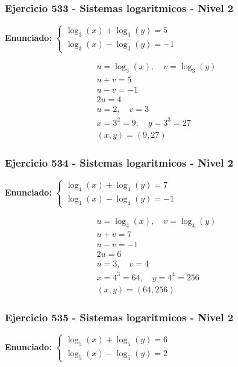 \documentclass[12pt,a4paper]{article}
\begin{document}
\subsubsection*{Ejercicio 533 - Sistemas logaritmicos - Nivel 2}
\textbf{Enunciado:} \(\begin{cases} \log_{3}\left(x\right)+\log_{3}\left(y\right)=5\\ \log_{3}\left(x\right)-\log_{3}\left(y\right)=-1\end{cases}\)

\[
\begin{aligned}
u=\log_{3}\left(x\right),\quad v=\log_{3}\left(y\right)\\
u+v=5\\
u-v=-1\\
2u=4\\
u=2,\quad v=3\\
x=3^{2}=9,\quad y=3^{3}=27\\
\boxed{(x,y)=(9,27)}
\end{aligned}
\]


\subsubsection*{Ejercicio 534 - Sistemas logaritmicos - Nivel 2}
\textbf{Enunciado:} \(\begin{cases} \log_{4}\left(x\right)+\log_{4}\left(y\right)=7\\ \log_{4}\left(x\right)-\log_{4}\left(y\right)=-1\end{cases}\)

\[
\begin{aligned}
u=\log_{4}\left(x\right),\quad v=\log_{4}\left(y\right)\\
u+v=7\\
u-v=-1\\
2u=6\\
u=3,\quad v=4\\
x=4^{3}=64,\quad y=4^{4}=256\\
\boxed{(x,y)=(64,256)}
\end{aligned}
\]


\subsubsection*{Ejercicio 535 - Sistemas logaritmicos - Nivel 2}
\textbf{Enunciado:} \(\begin{cases} \log_{5}\left(x\right)+\log_{5}\left(y\right)=6\\ \log_{5}\left(x\right)-\log_{5}\left(y\right)=2\end{cases}\)
\end{document}
